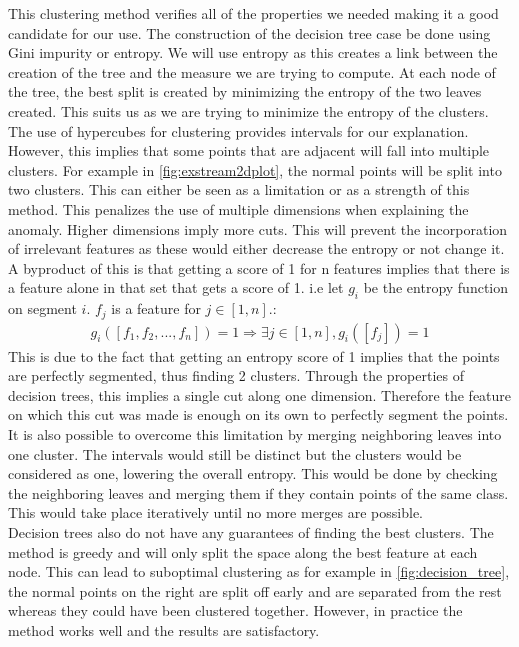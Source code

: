 \documentclass[oneside, a4paper, onecolumn, 11pt]{article}
\begin{document}
This clustering method verifies all of the properties we needed making it a good candidate for our use. The construction of the decision tree case be done using Gini impurity or entropy. We will use entropy as this creates a link between the creation of the tree and the measure we are trying to compute. At each node of the tree, the best split is created by minimizing the entropy of the two leaves created. This suits us as we are trying to minimize the entropy of the clusters.\\
The use of hypercubes for clustering provides intervals for our explanation. However, this implies that some points that are adjacent will fall into multiple clusters. For example in \autoref{fig:exstream2dplot}, the normal points will be split into two clusters. This can either be seen as a limitation or as a strength of this method. This penalizes the use of multiple dimensions when explaining the anomaly. Higher dimensions imply more cuts. This will prevent the incorporation of irrelevant features as these would either decrease the entropy or not change it. A byproduct of this is that getting a score of 1 for n features implies that there is a feature alone in that set that gets a score of 1. i.e let $g_i$ be the entropy function on segment $i$. $f_j$ is a feature for $j\in[1, n]$.:
\begin{align*}
  g_i([f_1, f_2, ..., f_n]) = 1 \Rightarrow \exists j \in [1, n], g_i([f_j]) = 1
\end{align*}
This is due to the fact that getting an entropy score of 1 implies that the points are perfectly segmented, thus finding 2 clusters. Through the properties of decision trees, this implies a single cut along one dimension. Therefore the feature on which this cut was made is enough on its own to perfectly segment the points.\\
It is also possible to overcome this limitation by merging neighboring leaves into one cluster. The intervals would still be distinct but the clusters would be considered as one, lowering the overall entropy. This would be done by checking the neighboring leaves and merging them if they contain points of the same class. This would take place iteratively until no more merges are possible.\\
Decision trees also do not have any guarantees of finding the best clusters. The method is greedy and will only split the space along the best feature at each node. This can lead to suboptimal clustering as for example in \autoref{fig:decision_tree}, the normal points on the right are split off early and are separated from the rest whereas they could have been clustered together. However, in practice the method works well and the results are satisfactory.\\
\end{document}
